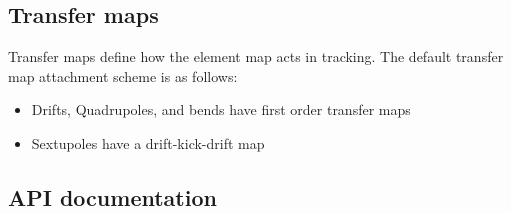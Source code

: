 \documentclass[letterpaper,10pt,english]{sphinxmanual}
\begin{document}

\begin{fulllineitems}
\label{cpbd:Drift}
\end{fulllineitems}


\begin{fulllineitems}
\label{cpbd:Quadrupole}
\end{fulllineitems}


\begin{fulllineitems}
\label{cpbd:Bend}
\end{fulllineitems}


\begin{fulllineitems}
\label{cpbd:SBend}
\end{fulllineitems}


\begin{fulllineitems}
\label{cpbd:RBend}
\end{fulllineitems}



\subsection{Transfer maps}
\label{cpbd:transfer-maps}
Transfer maps define how the element map acts in tracking.
The default transfer map attachment scheme is as follows:
\begin{itemize}
\item {} 
Drifts, Quadrupoles, and bends have first order transfer maps

\item {} 
Sextupoles have a drift-kick-drift map

\end{itemize}


\subsection{API documentation}
\label{cpbd:api-documentation}
\end{document}
